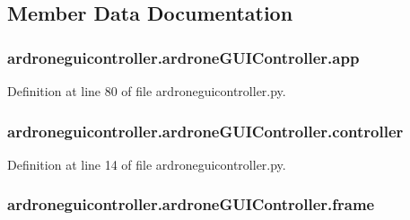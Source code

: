 \subsection{Member Data Documentation}
\hypertarget{classardroneguicontroller_1_1ardroneGUIController_ac902183e41baa2da5bde3b9c02c0031a}{
\subsubsection[{app}]{\setlength{\rightskip}{0pt plus 5cm}ardroneguicontroller.\-ardrone\-G\-U\-I\-Controller.\-app}}\label{classardroneguicontroller_1_1ardroneGUIController_ac902183e41baa2da5bde3b9c02c0031a}


Definition at line 80 of file ardroneguicontroller.\-py.

\hypertarget{classardroneguicontroller_1_1ardroneGUIController_a997e607f6b65bc91790c1e4e2f96baa7}{
\subsubsection[{controller}]{\setlength{\rightskip}{0pt plus 5cm}ardroneguicontroller.\-ardrone\-G\-U\-I\-Controller.\-controller}}\label{classardroneguicontroller_1_1ardroneGUIController_a997e607f6b65bc91790c1e4e2f96baa7}


Definition at line 14 of file ardroneguicontroller.\-py.

\hypertarget{classardroneguicontroller_1_1ardroneGUIController_a05649f2dcee17b7841468273e9d245de}{
\subsubsection[{frame}]{\setlength{\rightskip}{0pt plus 5cm}ardroneguicontroller.\-ardrone\-G\-U\-I\-Controller.\-frame}}\label{classardroneguicontroller_1_1ardroneGUIController_a05649f2dcee17b7841468273e9d245de}


